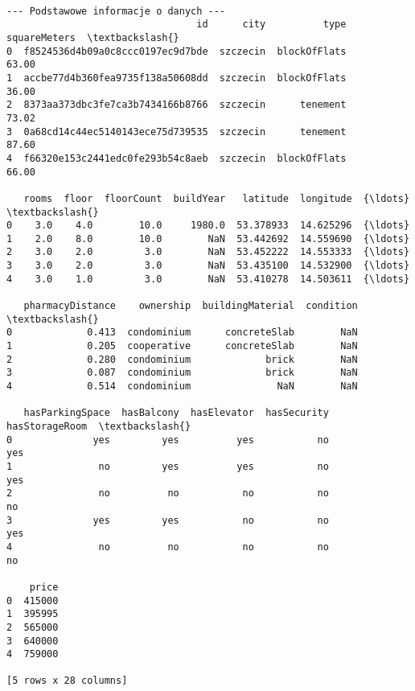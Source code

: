 \documentclass[11pt]{article}
\begin{document}
    \begin{Verbatim}[commandchars=\\\{\}]

--- Podstawowe informacje o danych ---
                                 id      city          type  squareMeters  \textbackslash{}
0  f8524536d4b09a0c8ccc0197ec9d7bde  szczecin  blockOfFlats         63.00
1  accbe77d4b360fea9735f138a50608dd  szczecin  blockOfFlats         36.00
2  8373aa373dbc3fe7ca3b7434166b8766  szczecin      tenement         73.02
3  0a68cd14c44ec5140143ece75d739535  szczecin      tenement         87.60
4  f66320e153c2441edc0fe293b54c8aeb  szczecin  blockOfFlats         66.00

   rooms  floor  floorCount  buildYear   latitude  longitude  {\ldots}  \textbackslash{}
0    3.0    4.0        10.0     1980.0  53.378933  14.625296  {\ldots}
1    2.0    8.0        10.0        NaN  53.442692  14.559690  {\ldots}
2    3.0    2.0         3.0        NaN  53.452222  14.553333  {\ldots}
3    3.0    2.0         3.0        NaN  53.435100  14.532900  {\ldots}
4    3.0    1.0         3.0        NaN  53.410278  14.503611  {\ldots}

   pharmacyDistance    ownership  buildingMaterial  condition  \textbackslash{}
0             0.413  condominium      concreteSlab        NaN
1             0.205  cooperative      concreteSlab        NaN
2             0.280  condominium             brick        NaN
3             0.087  condominium             brick        NaN
4             0.514  condominium               NaN        NaN

   hasParkingSpace  hasBalcony  hasElevator  hasSecurity  hasStorageRoom  \textbackslash{}
0              yes         yes          yes           no             yes
1               no         yes          yes           no             yes
2               no          no           no           no              no
3              yes         yes           no           no             yes
4               no          no           no           no              no

    price
0  415000
1  395995
2  565000
3  640000
4  759000

[5 rows x 28 columns]


\end{Verbatim}
\end{document}
